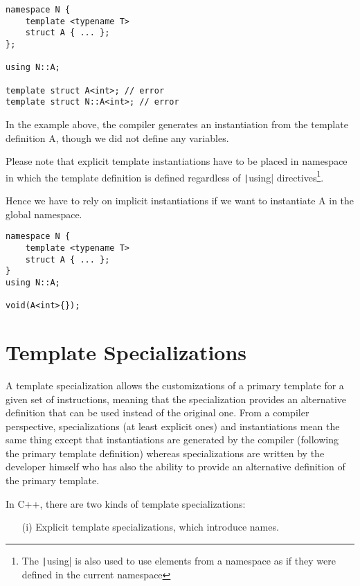 \begin{paracol}{2}
\begin{verbatim}
namespace N {
    template <typename T>
    struct A { ... };
};

using N::A;

template struct A<int>; // error
template struct N::A<int>; // error
\end{verbatim}

\switchcolumn

In the example above, the compiler generates an instantiation from the template definition A, though we did not define any variables. 

\vspace{10pt}

    Please note that explicit template instantiations have to be placed in namespace in which the template definition is defined regardless of \texttt|using| directives\footnote{The \texttt|using| is also used to use elements from a namespace as if they were defined in the current namespace}.
\end{paracol}

Hence we have to rely on implicit instantiations if we want to instantiate A in the global namespace.

\begin{verbatim}
namespace N { 
    template <typename T> 
    struct A { ... }; 
} 
using N::A; 

void(A<int>{});
\end{verbatim}

\section*{Template Specializations}

A template specialization allows the customizations of a primary template for a given set of instructions, meaning that the specialization provides an alternative definition that can be used instead of the original one. From a compiler perspective, specializations (at least explicit ones) and instantiations mean the same thing except that instantiations are generated by the compiler (following the primary template definition) whereas specializations are written by the developer himself who has also the ability to provide an alternative definition of the primary template.

\vspace{10pt}

In C++, there are two kinds of template specializations:
\begin{itemize}
    \item[(i)] Explicit template specializations, which introduce names.
\end{itemize}

